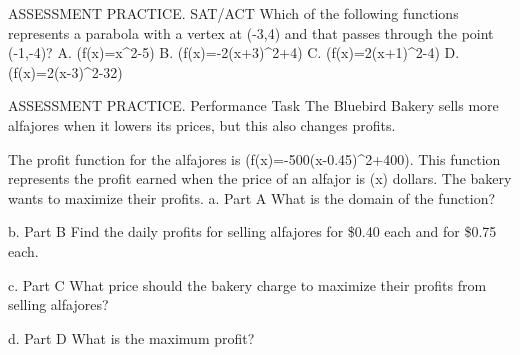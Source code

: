 \documentclass{article}
\newenvironment{practice}[2]{}{}        %
\newcommand{\answer}[1]{}               %
\newcommand{\placeholder}[2]{}          %
\newcommand{\te}[1]{}                   %
\begin{document}
\begin{practice}{37}{1}
ASSESSMENT PRACTICE. SAT/ACT Which of the following functions represents a parabola with a vertex at (-3,4) and that passes through the point (-1,-4)?
A. (f(x)=x^2-5)
B. (f(x)=-2(x+3)^2+4)
C. (f(x)=2(x+1)^2-4)
D. (f(x)=2(x-3)^2-32)
\answer{B}
\end{practice}
\begin{practice}{38}{3}
ASSESSMENT PRACTICE. Performance Task The Bluebird Bakery sells more alfajores when it lowers its prices, but this also changes profits.
\placeholder{illustration}{Gray pedestal cake stand with golden sandwich cookies, price card showing 0.75 dollars each crossed out in red and 40 cents ea written below.}
The profit function for the alfajores is (f(x)=-500(x-0.45)^2+400). This function represents the profit earned when the price of an alfajor is (x) dollars. The bakery wants to maximize their profits.
a. Part A What is the domain of the function?
\answer{Part A The domain is (\{x\mid x>0\}). The value of (x) cannot be negative or 0 since it represents the price of a cookie.}
b. Part B Find the daily profits for selling alfajores for \$0.40 each and for \$0.75 each.
\answer{(f(0.40)=\$398.75); (f(0.75)=\$355)}
c. Part C What price should the bakery charge to maximize their profits from selling alfajores?
\answer{Part C The bakery should charge \$0.45 per cookie to make the maximum profit.}
\te{Printed inline Part C answer repeats Part B: (f(0.40)=\$398.75); (f(0.75)=\$355); likely a duplicated answer. The margin gives the price \$0.45.}
d. Part D What is the maximum profit?
\answer{The maximum profit the bakery can make is \$400.}
\end{practice}
\end{document}

